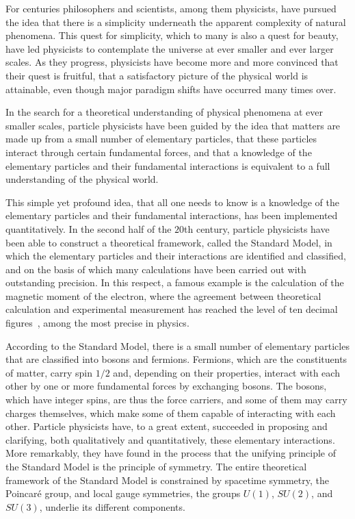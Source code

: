 
For centuries philosophers and scientists, among them physicists, have pursued
the idea that there is a simplicity underneath the apparent complexity of
natural phenomena. This quest for simplicity, which to many is also a quest for
beauty, have led physicists to contemplate the universe at ever smaller and
ever larger scales. As they progress, physicists have become more and more
convinced that their quest is fruitful, that a satisfactory picture of the
physical world is attainable, even though major paradigm shifts have occurred
many times over.

In the search for a theoretical understanding of physical phenomena at ever
smaller scales, particle physicists have been guided by the idea that matters
are made up from a small number of elementary particles, that these particles
interact through certain fundamental forces, and that a knowledge of the
elementary particles and their fundamental interactions is equivalent to a full
understanding of the physical world.

This simple yet profound idea, that all one needs to know is a knowledge of the
elementary particles and their fundamental interactions, has been implemented
quantitatively. In the second half of the $20$th century, particle physicists
have been able to construct a theoretical framework, called the Standard Model,
in which the elementary particles and their interactions are identified and
classified, and on the basis of which many calculations have been carried out
with outstanding precision. In this respect, a famous example is the
calculation of the magnetic moment of the electron, where the agreement between
theoretical calculation and experimental measurement has reached the level of
ten decimal figures~\cite{electronmoment}, among the most precise in physics.

According to the Standard Model, there is a small number of elementary
particles that are classified into bosons and fermions. Fermions, which are the
constituents of matter, carry spin $1/2$ and, depending on their properties,
interact with each other by one or more fundamental forces by exchanging
bosons. The bosons, which have integer spins, are thus the force carriers, and
some of them may carry charges themselves, which make some of them capable of
interacting with each other. Particle physicists have, to a great extent,
succeeded in proposing and clarifying, both qualitatively and quantitatively,
these elementary interactions. More remarkably, they have found in the process
that the unifying principle of the Standard Model is the principle of symmetry.
The entire theoretical framework of the Standard Model is constrained by
spacetime symmetry, the Poincar\'{e} group, and local gauge symmetries, the
groups $U(1)$, $SU(2)$, and $SU(3)$, underlie its different components.

